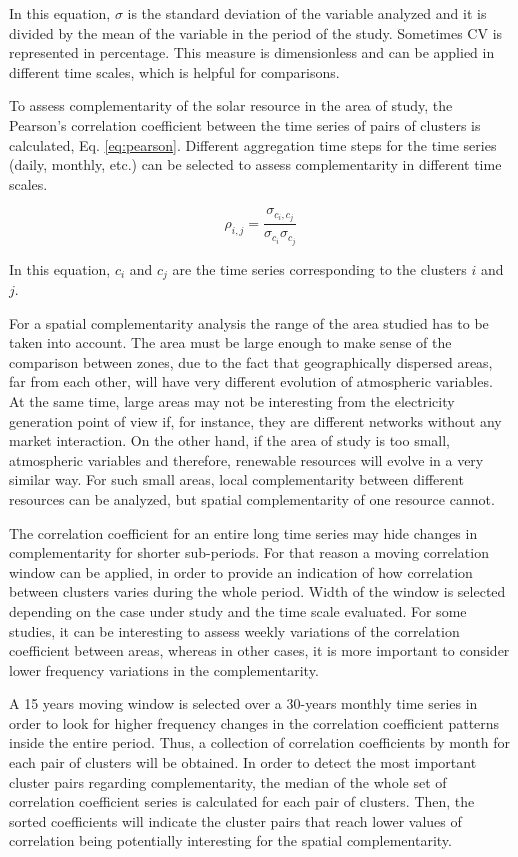 In this equation, $\sigma$ is the standard deviation of the variable analyzed and it is divided by the mean of the variable in the period of the study. Sometimes CV is represented in percentage. This measure is dimensionless and can be applied in different time scales, which is helpful for comparisons.

To assess complementarity of the solar resource in the area of study, the Pearson's correlation coefficient between the time series of pairs of clusters is calculated, Eq. \ref{eq:pearson}. Different aggregation time steps for the time series (daily, monthly, etc.) can be selected to assess complementarity in different time scales. 

\begin{equation}\label{eq:pearson}
  \rho_{i,j}=\frac{\sigma_{c_i,c_j}}{\sigma_{c_i}\sigma_{c_j}}
\end{equation}

In this equation, $c_i$ and $c_j$ are the time series corresponding to the clusters $i$ and $j$.

For a spatial complementarity analysis the range of the area studied has to be taken into account. The area must be large enough to make sense of the comparison between zones, due to the fact that geographically dispersed areas, far from each other, will have very different evolution of atmospheric variables. At the same time, large areas may not be interesting from the electricity generation point of view if, for instance, they are different networks without any market interaction. On the other hand, if the area of study is too small, atmospheric variables and therefore, renewable resources will evolve in a very similar way. For such small areas, local complementarity between different resources can be analyzed, but spatial complementarity of one resource cannot.

The correlation coefficient for an entire long time series may hide changes in complementarity for shorter sub-periods. For that reason a moving correlation window can be applied, in order to provide an indication of how correlation between clusters varies during the whole period. Width of the window is selected depending on the case under study and the time scale evaluated. For some studies, it can be interesting to assess weekly variations of the correlation coefficient between areas, whereas in other cases, it is more important to consider lower frequency variations in the complementarity.

A 15 years moving window is selected over a 30-years monthly time series in order to look for higher frequency changes in the correlation coefficient patterns inside the entire period. Thus, a collection of correlation coefficients by month for each pair of clusters will be obtained. In order to detect the most important cluster pairs regarding complementarity, the median of the whole set of correlation coefficient series is calculated for each pair of clusters. Then, the  sorted coefficients will indicate the cluster pairs that reach lower values of correlation being potentially interesting for the spatial complementarity.

